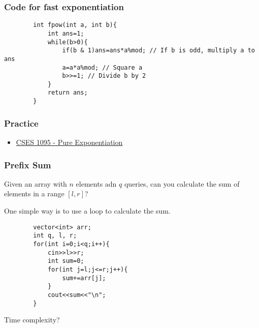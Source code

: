 \documentclass[xcolor=dvipsnames]{beamer}
\begin{document}
    \begin{frame}[fragile]
        \frametitle{Code for fast exponentiation}
        \begin{verbatim}
        int fpow(int a, int b){
            int ans=1;
            while(b>0){
                if(b & 1)ans=ans*a%mod; // If b is odd, multiply a to ans
                a=a*a%mod; // Square a
                b>>=1; // Divide b by 2
            }
            return ans;
        }
        \end{verbatim}
        
    \end{frame}

    \begin{frame}
        \frametitle{Practice}
        \begin{itemize}
            \item \href{https://cses.fi/problemset/task/1095}{CSES 1095 - Pure Exponentiation}
        \end{itemize}
    \end{frame}

    \begin{frame}[fragile]
        \frametitle{Prefix Sum}
        Given an array with $n$ elements adn $q$ queries,
        can you calculate the sum of elements in a range $[l, r]$?

        One simple way is to use a loop to calculate the sum.
        \begin{verbatim}
        vector<int> arr;
        int q, l, r;
        for(int i=0;i<q;i++){
            cin>>l>>r;
            int sum=0;
            for(int j=l;j<=r;j++){
                sum+=arr[j];
            }
            cout<<sum<<"\n";
        }
        \end{verbatim}        
        Time complexity?
    \end{frame}
\end{document}
